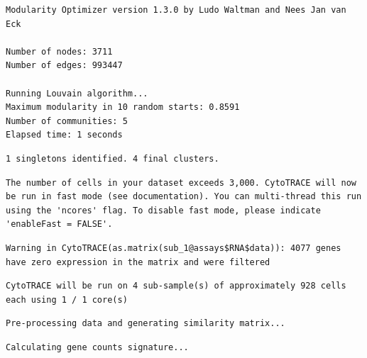 \documentclass[
  landscape]{article}
\newenvironment{Shaded}{\begin{snugshade}}{\end{snugshade}}
\newcommand{\DecValTok}[1]{\textcolor[rgb]{0.00,0.00,0.81}{#1}}
\newcommand{\FunctionTok}[1]{\textcolor[rgb]{0.13,0.29,0.53}{\textbf{#1}}}
\newcommand{\NormalTok}[1]{#1}
\newcommand{\OtherTok}[1]{\textcolor[rgb]{0.56,0.35,0.01}{#1}}
\newcommand{\SpecialCharTok}[1]{\textcolor[rgb]{0.81,0.36,0.00}{\textbf{#1}}}
\newcommand{\StringTok}[1]{\textcolor[rgb]{0.31,0.60,0.02}{#1}}
\begin{document}
\begin{verbatim}
Modularity Optimizer version 1.3.0 by Ludo Waltman and Nees Jan van Eck

Number of nodes: 3711
Number of edges: 993447

Running Louvain algorithm...
Maximum modularity in 10 random starts: 0.8591
Number of communities: 5
Elapsed time: 1 seconds
\end{verbatim}

\begin{verbatim}
1 singletons identified. 4 final clusters.
\end{verbatim}

\begin{Shaded}
\end{Shaded}

\begin{verbatim}
The number of cells in your dataset exceeds 3,000. CytoTRACE will now be run in fast mode (see documentation). You can multi-thread this run using the 'ncores' flag. To disable fast mode, please indicate 'enableFast = FALSE'.
\end{verbatim}

\begin{verbatim}
Warning in CytoTRACE(as.matrix(sub_1@assays$RNA$data)): 4077 genes have zero expression in the matrix and were filtered
\end{verbatim}

\begin{verbatim}
CytoTRACE will be run on 4 sub-sample(s) of approximately 928 cells each using 1 / 1 core(s)
\end{verbatim}

\begin{verbatim}
Pre-processing data and generating similarity matrix...
\end{verbatim}

\begin{verbatim}
Calculating gene counts signature...
\end{verbatim}
\end{document}
